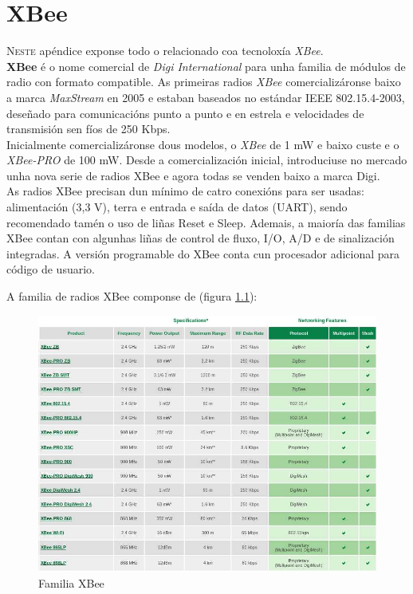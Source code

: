 \chapter{XBee}
\label{chap:xbee}


\lettrine{N}{este} apéndice exponse todo o relacionado coa tecnoloxía
\textit{XBee}. \\

\textbf{XBee} \cite{XBee} é o nome comercial de \textit{Digi International}
para unha familia de módulos de radio con formato compatible. As primeiras
radios \textit{XBee} comercializáronse baixo a marca \textit{MaxStream} en 2005
e estaban baseados no estándar IEEE 802.15.4-2003, deseñado para comunicacións
punto a punto e en estrela e velocidades de transmisión sen fíos de 250 Kbps. \\

Inicialmente comercializáronse dous modelos, o \textit{XBee} de 1 mW e baixo
custe e o \textit{XBee-PRO} de 100 mW. Desde a comercialización inicial,
introduciuse no mercado unha nova serie de radios XBee e agora todas se venden
baixo a marca Digi. \\

As radios XBee precisan dun mínimo de catro conexións para ser usadas:
alimentación (3,3 V), terra e entrada e saída de datos (UART), sendo
recomendado tamén o uso de liñas Reset e Sleep. Ademais, a maioría das familias
XBee contan con algunhas liñas de control de fluxo, I/O, A/D e de sinalización
integradas. A versión programable do XBee conta cun procesador adicional para
código de usuario.

A familia de radios XBee componse de (figura \ref{figura:FamiliaXbee}):

\begin{figure}[htbp]
 \centering
 \includegraphics[scale=0.5,keepaspectratio=true]{./imagenes/familia-xbee.png}
 \caption{Familia XBee \cite{XBee}}
 \label{figura:FamiliaXbee}
\end{figure}

